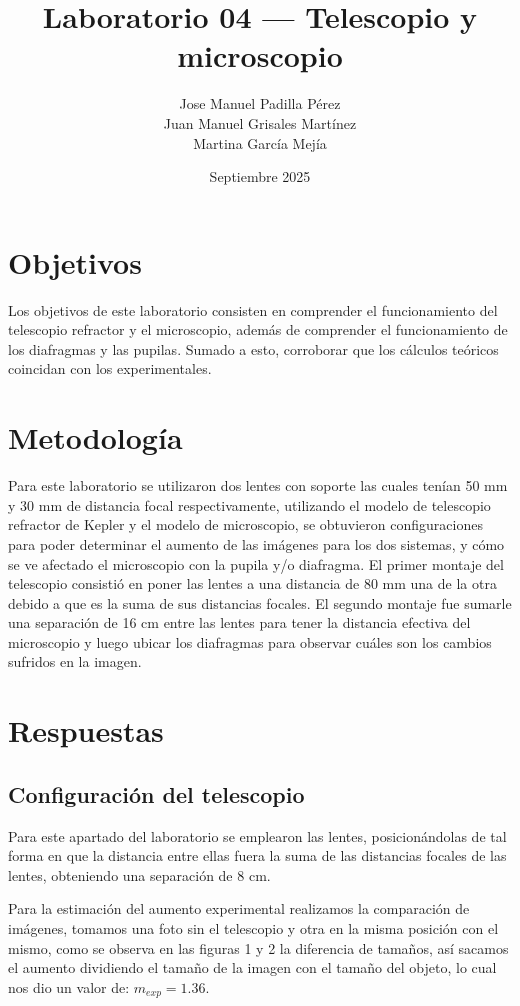 \documentclass[5p,letterpaper]{article}
\title{\textbf{Laboratorio 04 — Telescopio y microscopio}}
\author{
  Jose Manuel Padilla Pérez \\
  Juan Manuel Grisales Martínez \\
  Martina García Mejía
}
\date{Septiembre 2025}
\begin{document}
\maketitle

\section{Objetivos}

Los objetivos de este laboratorio consisten en comprender el funcionamiento del telescopio refractor y el microscopio, además de comprender el funcionamiento de los diafragmas y las pupilas. Sumado a esto, corroborar que los cálculos teóricos coincidan con los experimentales.

\section{Metodología}

Para este laboratorio se utilizaron dos lentes con soporte las cuales tenían 50 mm y 30 mm de distancia focal respectivamente, utilizando el modelo de telescopio refractor de Kepler y el modelo de microscopio, se obtuvieron configuraciones para poder determinar el aumento de las imágenes para los dos sistemas, y cómo se ve afectado el microscopio con la pupila y/o diafragma. El primer montaje del telescopio consistió en poner las lentes a una distancia de 80 mm una de la otra debido a que es la suma de sus distancias focales. El segundo montaje fue sumarle una separación de 16 cm entre las lentes para tener la distancia efectiva del microscopio y luego ubicar los diafragmas para observar cuáles son los cambios sufridos en la imagen.

\section{Respuestas}

\subsection{Configuración del telescopio}
Para este apartado del laboratorio se emplearon las lentes, posicionándolas de tal forma en que la distancia entre ellas fuera la suma de las distancias focales de las lentes, obteniendo una separación de 8 cm.

Para la estimación del aumento experimental realizamos la comparación de imágenes, tomamos una foto sin el telescopio y otra en la misma posición con el mismo, como se observa en las figuras 1 y 2 la diferencia de tamaños, así sacamos el aumento dividiendo el tamaño de la imagen con el tamaño del objeto, lo cual nos dio un valor de: $m_{exp} = 1.36$.
\end{document}
